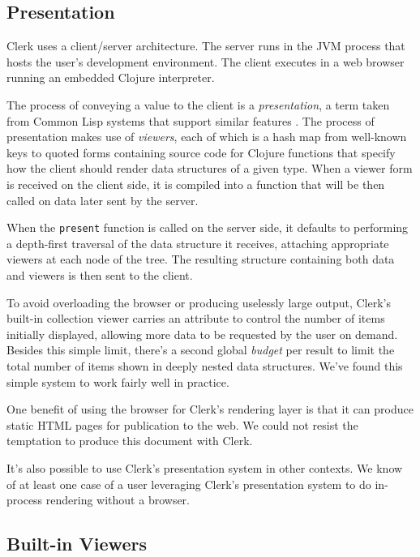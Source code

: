 \documentclass[sigconf,screen]{acmart}
\newcommand{\passthrough}[1]{#1}
\begin{document}
\hypertarget{id}{%
\subsection{Presentation}\label{id}}

Clerk uses a client/server architecture. The server runs in the JVM process that hosts the user's development environment. The client executes in a web browser running an embedded Clojure interpreter.

The process of conveying a value to the client is a \emph{presentation}, a
term taken from Common Lisp systems that support similar features . The process of presentation makes use of \emph{viewers}, each of which is a hash map from well-known keys to quoted forms containing source code for Clojure functions that specify how the client should render data structures of a given type. When a viewer form is received on the client side, it is compiled into a function that will be then called on data later sent by the server.

When the \passthrough{\lstinline!present!} function is called on the server side, it defaults to performing a depth-first traversal of the data structure it receives, attaching appropriate viewers at each node of the tree. The resulting structure containing both data and viewers is then sent to the client.

To avoid overloading the browser or producing uselessly large output, Clerk's built-in collection viewer carries an attribute to control the number of items initially displayed, allowing more data to be requested by the user on demand. Besides this simple limit, there's a second global \emph{budget} per result to limit the total number of items shown in deeply nested data structures. We've found this simple system to work fairly well in practice.

One benefit of using the browser for Clerk's rendering layer is that it can produce static HTML pages for publication to the web. We could not resist the temptation to produce this document with Clerk.

It's also possible to use Clerk's presentation system in other contexts. We know of at least one case of a user leveraging Clerk's presentation system to do in-process rendering without a browser.

\hypertarget{id}{%
\subsection{Built-in Viewers}\label{id}}
\end{document}
